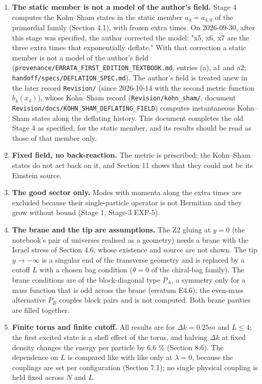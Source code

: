 \documentclass[11pt]{article}
\begin{document}
\begin{enumerate}
\item \textbf{The static member is not a model of the author's field.} Stage 4 computes the Kohn--Sham states in the static member $a_4=a_{4,0}$ of the primordial family (Section 4.1), with frozen extra times. On 2026-09-30, after this stage was specified, the author corrected the model: "x5, x6, x7 are the three extra times that exponentially deflate." With that correction a static member is not a model of the author's field (\texttt{provenan\allowbreak{}ce/ERRAT\allowbreak{}A\_FIRST\_\allowbreak{}EDITION\_\allowbreak{}TEXTBOOK\allowbreak{}.md}, entries (a), a1 and a2; \texttt{handoff/\allowbreak{}specs/DE\allowbreak{}FLATION\_\allowbreak{}SPEC.md}). The author's field is treated anew in the later record \texttt{Revision\allowbreak{}/} (since 2026-10-14 with the second metric function $b_4(x_4)$), whose Kohn--Sham record (\texttt{Revision\allowbreak{}/kohn\_sh\allowbreak{}am/}, document \texttt{Revision\allowbreak{}/docs/KO\allowbreak{}HN\_SHAM\_\allowbreak{}DEFLATIN\allowbreak{}G\_FIELD}) computes instantaneous Kohn--Sham states along the deflating history. This document completes the old Stage 4 as specified, for the static member, and its results should be read as those of that member only.
\item \textbf{Fixed field, no back-reaction.} The metric is prescribed; the Kohn--Sham states do not act back on it, and Section 11 shows that they could not be its Einstein source.
\item \textbf{The good sector only.} Modes with momenta along the extra times are excluded because their single-particle operator is not Hermitian and they grow without bound (Stage 1, Stage-3 EXP-5).
\item \textbf{The brane and the tip are assumptions.} The Z2 gluing at $y=0$ (the notebook's pair of universes realised as a geometry) needs a brane with the Israel stress of Section 4.6, whose existence and source are not shown. The tip $y\to-\infty$ is a singular end of the transverse geometry and is replaced by a cutoff $L$ with a chosen bag condition ($\theta=0$ of the chiral-bag family). The brane conditions are of the block-diagonal type $P_A$, a symmetry only for a mass function that is odd across the brane (erratum E4.6); the even-mass alternative $P_B$ couples block pairs and is not computed. Both brane parities are filled together.
\item \textbf{Finite torus and finite cutoff.} All results are for $\Delta k=0.25m$ and $L\le4$; the first excited state is a shell effect of the torus, and halving $\Delta k$ at fixed density changes the energy per particle by 6.6 \% (Section 8.6). The dependence on $L$ is compared like with like only at $\lambda=0$, because the couplings are set per configuration (Section 7.1); no single physical coupling is held fixed across $N$ and $L$.

\end{enumerate}
\end{document}
